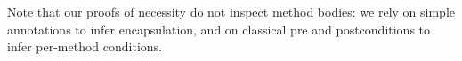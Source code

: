 %  



  





 

\noindent
Note that our proofs of necessity do not inspect method
bodies: we rely on simple annotations to infer encapsulation, and on
classical pre and postconditions to infer per-method conditions. 
